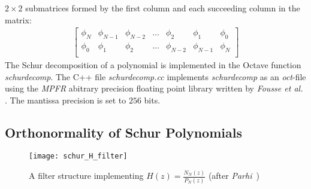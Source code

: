 \documentclass[a4paper,twoside,10pt,english]{report}
\begin{document}
$2\times{}2$ submatrices formed by the first column and each succeeding column
in the matrix:
\begin{align*}
\left[
\begin{array}{ccccccc}
\phi_{N} & \phi_{N-1} & \phi_{N-2} & \hdots & \phi_{2} & \phi_{1} & \phi_{0} \\
\phi_{0} & \phi_{1} & \phi_{2} & \hdots & \phi_{N-2} & \phi_{N-1} & \phi_{N} \\
\end{array}
\right]
\end{align*}
The Schur decomposition of a polynomial is implemented in the Octave function
\emph{schurdecomp}. 
The C++ file \emph{schurdecomp.cc} implements \emph{schurdecomp} as an
\emph{oct}-file using the \emph{MPFR} abitrary precision floating point library 
\cite{Fousse_MPFR, GNU_GMP} written by \emph{Fousse et al.}
\cite{Fousse:2007:MMB:1236463.1236468}. The mantissa precision is set to 
$256$ bits.

\subsection{Orthonormality of Schur Polynomials}
\begin{figure}[!htbp]
\begin{center}
\texttt{[image: schur\_H\_filter]}
\caption{A filter structure implementing
  $H\left(z\right)=\frac{N_{N}\left(z\right)}{P_{N}\left(z\right)}$ (after 
\emph{Parhi}~\cite[Fig. 12.1]{Parhi_VLSIDigitalSignalProcessingSystems})}
\label{fig:A-filter-structure}
\end{center}
\end{figure}
\end{document}
